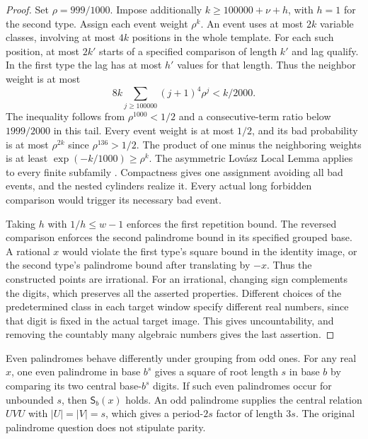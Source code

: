 \begin{proof}
Set $\rho=999/1000$. Impose additionally $k\ge100000+\nu+h$, with $h=1$ for the second type. Assign each event weight $\rho^k$. An event uses at most $2k$ variable classes, involving at most $4k$ positions in the whole template. For each such position, at most $2k'$ starts of a specified comparison of length $k'$ and lag qualify. In the first type the lag has at most $h'$ values for that length. Thus the neighbor weight is at most
\[
 8k\sum_{j\ge100000}(j+1)^4\rho^j<k/2000 .
\]
The inequality follows from $\rho^{1000}<1/2$ and a consecutive-term ratio below $1999/2000$ in this tail. Every event weight is at most $1/2$, and its bad probability is at most $\rho^{2k}$ since $\rho^{136}>1/2$. The product of one minus the neighboring weights is at least $\exp(-k/1000)\ge\rho^k$. The asymmetric Lov\'asz Local Lemma applies to every finite subfamily \cite[Theorem 1.2]{MT}. Compactness gives one assignment avoiding all bad events, and the nested cylinders realize it. Every actual long forbidden comparison would trigger its necessary bad event.

Taking $h$ with $1/h\le w-1$ enforces the first repetition bound. The reversed comparison enforces the second palindrome bound in its specified grouped base. A rational $x$ would violate the first type's square bound in the identity image, or the second type's palindrome bound after translating by $-x$. Thus the constructed points are irrational. For an irrational, changing sign complements the digits, which preserves all the asserted properties. Different choices of the predetermined class in each target window specify different real numbers, since that digit is fixed in the actual target image. This gives uncountability, and removing the countably many algebraic numbers gives the last assertion.
\end{proof}

\begin{remark}
Even palindromes behave differently under grouping from odd ones. For any real $x$, one even palindrome in base $b^s$ gives a square of root length $s$ in base $b$ by comparing its two central base-$b^s$ digits. If such even palindromes occur for unbounded $s$, then $\mathsf S_b(x)$ holds. An odd palindrome supplies the central relation $UVU$ with $|U|=|V|=s$, which gives a period-$2s$ factor of length $3s$. The original palindrome question does not stipulate parity.
\end{remark}
